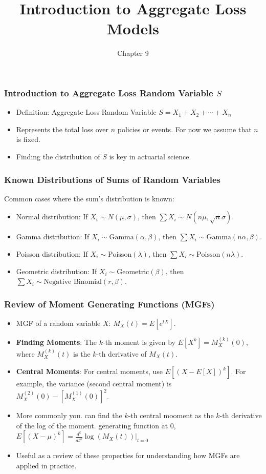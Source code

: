 \documentclass[compress,mathserif]{beamer}
\title[Aggregate Loss Models]{Introduction to Aggregate Loss Models}
\author{Chapter 9}
\institute[Stat 346]{Stat 346 - Short-term Actuarial Math}
\date[BYU]{}
\begin{document}
\begin{frame}
 \titlepage
\end{frame}

\begin{frame}
\frametitle{Introduction to Aggregate Loss Random Variable \( S \)}
\begin{itemize}
    \item Definition: Aggregate Loss Random Variable \( S = X_1 + X_2 + \cdots + X_n \)
    \item Represents the total loss over \( n \) policies or events. For now we assume that $n$ is fixed. 
    \item Finding the distribution of \( S \) is key in actuarial science.
\end{itemize}
\end{frame}

\begin{frame}
\frametitle{Known Distributions of Sums of Random Variables}
Common cases where the sum's distribution is known:
\begin{itemize}
    \item Normal distribution: If \( X_i \sim N(\mu, \sigma) \), then \( \sum X_i \sim N(n\mu, \sqrt{n}\sigma) \).
    \item Gamma distribution: If \( X_i \sim \text{Gamma}(\alpha, \beta) \), then \( \sum X_i \sim \text{Gamma}(n\alpha, \beta) \).
    \item Poisson distribution: If \( X_i \sim \text{Poisson}(\lambda) \), then \( \sum X_i \sim \text{Poisson}(n\lambda) \).
    \item Geometric distribution: If \( X_i \sim \text{Geometric}(\beta) \), then \( \sum X_i \sim \text{Negative Binomial}(r, \beta) \).
\end{itemize}
\end{frame}

\begin{frame}
\frametitle{Review of Moment Generating Functions (MGFs)}
\begin{itemize}
    \item MGF of a random variable \( X \): \( M_X(t) = E[e^{tX}] \).
    \item \textbf{Finding Moments}: The \( k \)-th moment is given by \( E[X^k] = M_X^{(k)}(0) \), where \( M_X^{(k)}(t) \) is the \( k \)-th derivative of \( M_X(t) \).
    \item \textbf{Central Moments}: For central moments, use \( E[(X - E[X])^k] \). For example, the variance (second central moment) is \( M_X^{(2)}(0) - [M_X^{(1)}(0)]^2 \).
    \item More commonly you. can find the $k$-th central mooment as the $k$-th derivative of the log of the moment. generating function at 0, $E[(X-\mu)^k] = \frac{d^k}{dt^k} \log{(M_X(t))} \vert_{t = 0}$
    \item Useful as a review of these properties for understanding how MGFs are applied in practice.
\end{itemize}
\end{frame}
\end{document}
